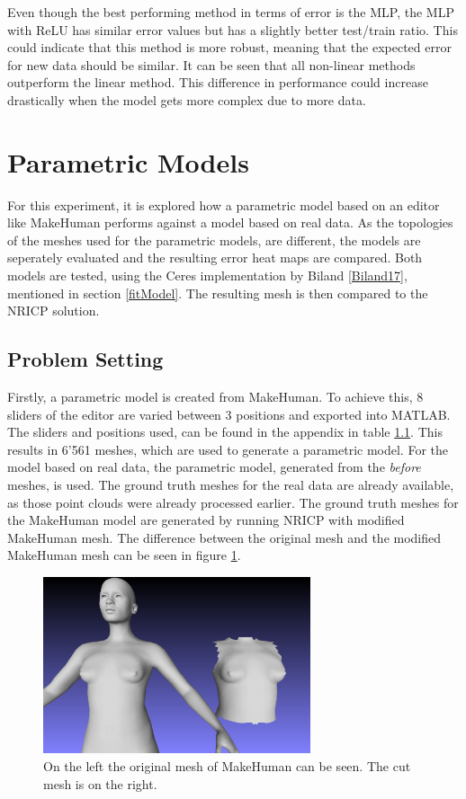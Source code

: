 Even though the best performing method in terms of error is the MLP, the MLP with ReLU has similar error values but has a slightly better test/train ratio. This could indicate that this method is more robust, meaning that the expected error for new data should be similar. It can be seen that all non-linear methods outperform the linear method. This difference in performance could increase drastically when the model gets more complex due to more data.

\section{Parametric Models}
For this experiment, it is explored how a parametric model based on an editor like MakeHuman performs against a model based on real data. As the topologies of the meshes used for the parametric models, are different, the models are seperately evaluated and the resulting error heat maps are compared. Both models are tested, using the Ceres implementation by Biland \ref{Biland17}, mentioned in section \ref{fitModel}. The resulting mesh is then compared to the NRICP solution.
\subsection{Problem Setting}
Firstly, a parametric model is created from MakeHuman. To achieve this, 8 sliders of the editor are varied between 3 positions and exported into MATLAB. The sliders and positions used, can be found in the appendix in table \ref{}. %
This results in 6'561 meshes, which are used to generate a parametric model. For the model based on real data, the parametric model, generated from the \textit{before} meshes, is used. The ground truth meshes for the real data are already available, as those point clouds were already processed earlier. The ground truth meshes for the MakeHuman model are generated by running NRICP with modified MakeHuman mesh. The difference between the original mesh and the modified MakeHuman mesh can be seen in figure \ref{fig:mhcut}.

\begin{figure}[h]
\centering
\includegraphics[width=0.7\textwidth]{figures/meshcut00}
\caption[Cut MakeHuman mesh]{On the left the original mesh of MakeHuman can be seen. The cut mesh is on the right.}
\label{fig:mhcut}
\end{figure}

